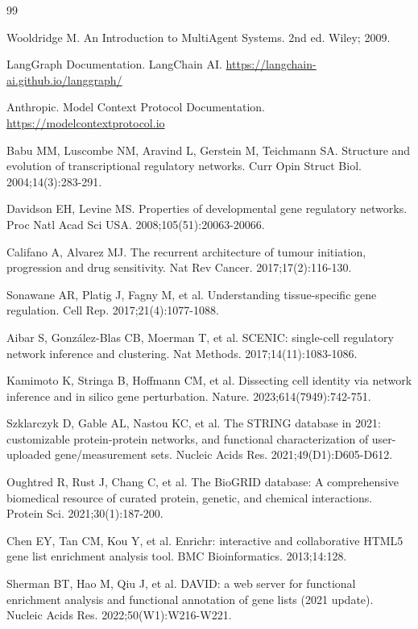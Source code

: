 \documentclass[11pt]{article}
\begin{document}
\begin{thebibliography}{99}

Wooldridge M. An Introduction to MultiAgent Systems. 2nd ed. Wiley; 2009.

LangGraph Documentation. LangChain AI. \url{https://langchain-ai.github.io/langgraph/}

Anthropic. Model Context Protocol Documentation. \url{https://modelcontextprotocol.io}

Babu MM, Luscombe NM, Aravind L, Gerstein M, Teichmann SA. Structure and evolution of transcriptional regulatory networks. Curr Opin Struct Biol. 2004;14(3):283-291.

Davidson EH, Levine MS. Properties of developmental gene regulatory networks. Proc Natl Acad Sci USA. 2008;105(51):20063-20066.

Califano A, Alvarez MJ. The recurrent architecture of tumour initiation, progression and drug sensitivity. Nat Rev Cancer. 2017;17(2):116-130.

Sonawane AR, Platig J, Fagny M, et al. Understanding tissue-specific gene regulation. Cell Rep. 2017;21(4):1077-1088.

Aibar S, González-Blas CB, Moerman T, et al. SCENIC: single-cell regulatory network inference and clustering. Nat Methods. 2017;14(11):1083-1086.

Kamimoto K, Stringa B, Hoffmann CM, et al. Dissecting cell identity via network inference and in silico gene perturbation. Nature. 2023;614(7949):742-751.

Szklarczyk D, Gable AL, Nastou KC, et al. The STRING database in 2021: customizable protein-protein networks, and functional characterization of user-uploaded gene/measurement sets. Nucleic Acids Res. 2021;49(D1):D605-D612.

Oughtred R, Rust J, Chang C, et al. The BioGRID database: A comprehensive biomedical resource of curated protein, genetic, and chemical interactions. Protein Sci. 2021;30(1):187-200.

Chen EY, Tan CM, Kou Y, et al. Enrichr: interactive and collaborative HTML5 gene list enrichment analysis tool. BMC Bioinformatics. 2013;14:128.

Sherman BT, Hao M, Qiu J, et al. DAVID: a web server for functional enrichment analysis and functional annotation of gene lists (2021 update). Nucleic Acids Res. 2022;50(W1):W216-W221.


\end{thebibliography}
\end{document}
